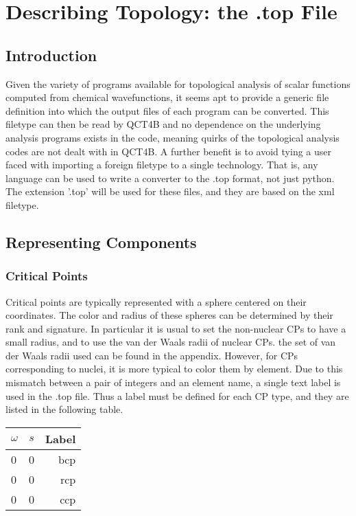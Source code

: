 \documentclass{report}
\begin{document}
\chapter{Describing Topology: the .top File}

\section{Introduction}

Given the variety of programs available for topological analysis of scalar functions computed from chemical wavefunctions,
it seems apt to provide a generic file definition into which the output files of each program can be converted.
This filetype can then be read by QCT4B and no dependence on the underlying analysis programs exists in the code, meaning quirks of the topological analysis codes are not dealt with in QCT4B.
A further benefit is to avoid tying a user faced with importing a foreign filetype to a single technology.
That is, any language can be used to write a converter to the .top format, not just python.
The extension '.top' will be used for these files, and they are based on the xml filetype.

\section{Representing Components}

\subsection{Critical Points}
Critical points are typically represented with a sphere centered on their coordinates.
The color and radius of these spheres can be determined by their rank and signature.
In particular it is usual to set the non-nuclear CPs to have a small radius, and to use the van der Waals radii of nuclear CPs.
the set of van der Waals radii used can be found in the appendix.
However, for CPs corresponding to nuclei, it is more typical to color them by element.
Due to this mismatch between a pair of integers and an element name, a single text label is used in the .top file.
Thus a label must be defined for each CP type, and they are listed in the following table.

\begin{tabular}{ l c || r }
$\omega$ & $s$ & Label \\
\hline
0 & 0 & bcp \\
0 & 0 & rcp \\
0 & 0 & ccp \\
\end{tabular}
\end{document}
